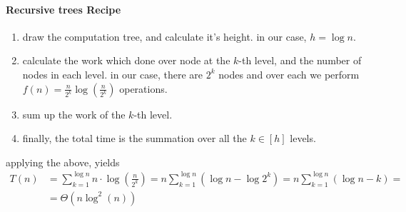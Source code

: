 \paragraph{Recursive trees Recipe}
    \begin{enumerate}
        \item draw the computation tree, and calculate it's height. in our case, \( h = \log n \).
        \item calculate the work which done over node at the \(k\)-th level, and the number of nodes in each level. in our case, there are \(2^k\) nodes and over each we perform \(f(n) = \frac{n}{2^k} \log\left( \frac{n}{2^k}\right)\) operations. 
        \item sum up the work of the \(k\)-th level.
        \item finally, the total time is the summation over all the \( k \in [h]\) levels. 
    \end{enumerate}
applying the above, yields 
\begin{equation*} 
\begin{split} 
T\left(n\right) & =  \sum_{k=1}^{\log{n}}{n\cdot\log \left( \frac{n}{2^k}\right)} = n\sum_{k=1}^{\log{n}}{ \left( \log n - \log 2^k \right) } 
  = n\sum_{k=1}^{\log{n}}{ \left( \log n - k \right) } = \\ & = \Theta \left( n \log^2 \left(n\right)  \right) 
\end{split}
\end{equation*}

